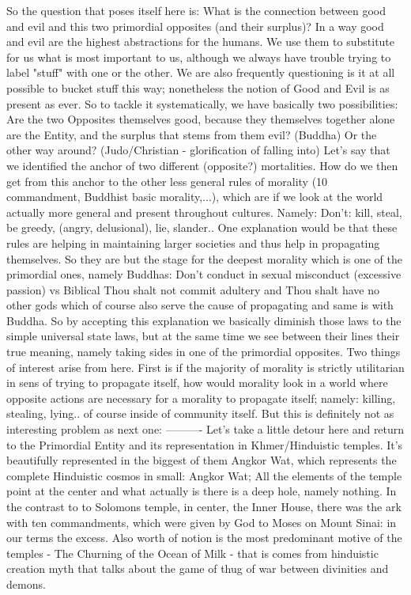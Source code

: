 \documentclass{book}
\begin{document}
So the question that poses itself here is: What is the connection between good and evil and this two primordial opposites (and their surplus)?
In a way good and evil are the highest abstractions for the humans. We use them to substitute for us what is most important to us, although we always have trouble trying to label "stuff" with one or the other. We are also frequently questioning is it at all possible to bucket stuff this way; nonetheless the notion of Good and Evil is as present as ever. 
So to tackle it systematically, we have basically two possibilities: Are the two Opposites themselves good, because they themselves together alone are the Entity, and the surplus that stems from them evil? (Buddha) Or the other way around? (Judo/Christian - glorification of falling into)
Let's say that we identified the anchor of two different (opposite?) mortalities. How do we then get from this anchor to the other less general rules of morality (10 commandment, Buddhist basic morality,...), which are if we look at the world actually more general and present throughout cultures. Namely: Don't: kill, steal, be greedy, (angry, delusional), lie, slander.. One explanation would be that these rules are helping in maintaining larger societies and thus help in propagating themselves. So they are but the stage for the deepest morality which is one of the primordial ones, namely Buddhas: Don't conduct in sexual misconduct (excessive passion) vs Biblical Thou shalt not commit adultery and Thou shalt have no other gods which of course also serve the cause of propagating and same is with Buddha.
So by accepting this explanation we basically diminish those laws to the simple universal state laws, but at the same time we see between their lines their true meaning, namely taking sides in one of the primordial opposites. Two things of interest arise from here. First is if the majority of morality is strictly utilitarian in sens of trying to propagate itself, how would morality look in a world where opposite actions are necessary for a morality to propagate itself; namely: killing, stealing, lying.. of course inside of community itself. But this is definitely not as interesting problem as next one: 
----------
Let's take a little detour here and return to the Primordial Entity and its representation in Khmer/Hinduistic temples. It's beautifully represented in the biggest of them Angkor Wat, which represents the complete Hinduistic cosmos in small: Angkor Wat; All the elements of the temple point at the center and what actually is there is a deep hole, namely nothing. In the contrast to to Solomons temple, in center, the Inner House, there was the ark with ten commandments, which were given by God to Moses on Mount Sinai: in our terms the excess. Also worth of notion is the most predominant motive of the temples - The Churning of the Ocean of Milk - that is comes from hinduistic creation myth that talks about the game of thug of war between divinities and demons.
\end{document}
